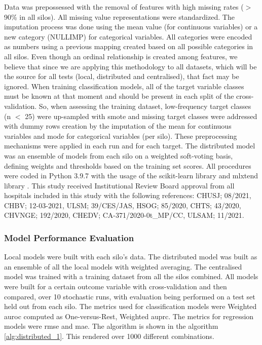 Data was prepossessed with the removal of features with high missing rates ($>$ 90\% in all silos). All missing value representations were standardized. The imputation process was done using the mean value (for continuous variables) or a new category (NULLIMP) for categorical variables. All categories were encoded as numbers using a previous mapping created based on all possible categories in all silos. Even though an ordinal relationship is created among features, we believe that since we are applying this methodology to all datasets, which will be the source for all tests (local, distributed and centralised), that fact may be ignored.
When training classification models, all of the target variable classes must be known at that moment and should be present in each split of the cross-validation. So, when assessing the training dataset, low-frequency target classes (n $<$ 25) were up-sampled with \ac{smote} \cite{smote} and missing target classes were addressed with dummy rows creation by the imputation of the mean for continuous variables and mode for categorical variables (per silo). These preprocessing mechanisms were applied in each run and for each target.
The distributed model was an ensemble of models from each silo on a weighted soft-voting basis, defining weights and thresholds based on the training set scores. 
All procedures were coded in Python 3.9.7 with the usage of the scikit-learn library \cite{scikit-learn} and mlxtend library \cite{mlxtend}.
This study received Institutional Review Board approval from all hospitals included in this study with the following references: CHUSJ; 08/2021, CHBV; 12-03-2021, ULSM; 39/CES/JAS, HSOG; 85/2020, CHTS; 43/2020, CHVNGE; 192/2020,
CHEDV; CA-371/2020-0t\_MP/CC, ULSAM; 11/2021.


\subsubsection{Model Performance Evaluation}

Local models were built with each silo's data. The distributed model was built as an ensemble of all the local models with weighted averaging. The centralised model was trained with a training dataset from all the silos combined. 
All models were built for a certain outcome variable with cross-validation and then compared, over 10 stochastic runs, with evaluation being performed on a test set held out from each silo. The metrics used for classification models were Weighted \ac{auroc} computed as One-versus-Rest, Weighted \ac{auprc}. The metrics for regression models were \ac{rmse} and \ac{mae}. The algorithm is shown in the algorithm \ref{alg:distributed_1}. This rendered over 1000 different combinations.


